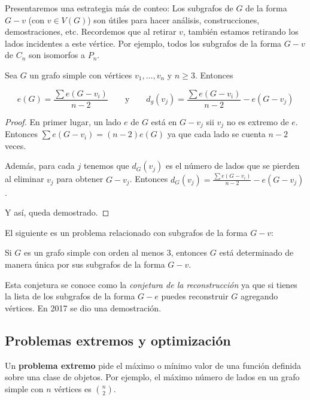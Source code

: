 Presentaremos una estrategia más de conteo: Los subgrafos de $G$ de la forma $G - v$ (con $v \in V(G)$) son útiles para hacer análisis, construcciones, demostraciones, etc. Recordemos que al retirar $v$, también estamos retirando los lados incidentes a este vértice. Por ejemplo, todos los subgrafos de la forma $G - v$ de $C_n$ son isomorfos a $P_n$.

\begin{pro}
    Sea $G$ un grafo simple con vértices $v_1, \dots, v_n$ y $n \geq 3$. Entonces
    
    \[
    e(G) = \dfrac{\sum e(G - v_i)}{n-2} \qquad \text{y} \qquad d_g(v_j) = \dfrac{\sum e(G - v_i)}{n-2} - e(G - v_j)
    \]
\end{pro}

\begin{proof}
    En primer lugar, un lado $e$ de $G$ está en $G - v_j$ sii $v_j$ no es extremo de $e$. Entonces $\sum e(G - v_i) = (n-2)e(G)$ ya que cada lado se cuenta $n-2$ veces.
    
    Además, para cada $j$ tenemos que $d_G(v_j)$ es el número de lados que se pierden al eliminar $v_j$ para obtener $G - v_j$. Entonces $d_G(v_j) = \frac{\sum e(G - v_i)}{n-2} - e(G - v_j)$.
    
    Y así, queda demostrado.
\end{proof}

El siguiente es un problema relacionado con subgrafos de la forma $G-v$:

\begin{prob}
    Si $G$ es un grafo simple con orden al menos $3$, entonces $G$ está determinado de manera única por sus subgrafos de la forma $G - v$.
    
    Esta conjetura se conoce como la \textit{conjetura de la reconstrucción} ya que si tienes la lista de los subgrafos de la forma $G - e$ puedes reconstruir $G$ agregando vértices. En 2017 se dio una demostración.
\end{prob}

\subsection{Problemas extremos y optimización}

Un \textbf{problema extremo} pide el máximo o mínimo valor de una función definida sobre una clase de objetos. Por ejemplo, el máximo número de lados en un grafo simple con $n$ vértices es $\binom{n}{2}$.

